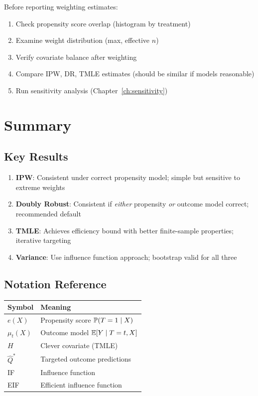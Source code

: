 Before reporting weighting estimates:
\begin{enumerate}
    \item Check propensity score overlap (histogram by treatment)
    \item Examine weight distribution (max, effective $n$)
    \item Verify covariate balance after weighting
    \item Compare IPW, DR, TMLE estimates (should be similar if models reasonable)
    \item Run sensitivity analysis (Chapter~\ref{ch:sensitivity})
\end{enumerate}

\section{Summary}
\label{sec:weighting_summary}

\subsection{Key Results}

\begin{enumerate}
    \item \textbf{IPW}: Consistent under correct propensity model; simple but sensitive to extreme weights

    \item \textbf{Doubly Robust}: Consistent if \emph{either} propensity \emph{or} outcome model correct; recommended default

    \item \textbf{TMLE}: Achieves efficiency bound with better finite-sample properties; iterative targeting

    \item \textbf{Variance}: Use influence function approach; bootstrap valid for all three
\end{enumerate}

\subsection{Notation Reference}

\begin{center}
\begin{tabular}{ll}
\toprule
Symbol & Meaning \\
\midrule
$e(X)$ & Propensity score $\mathbb{P}(T=1 \mid X)$ \\
$\mu_t(X)$ & Outcome model $\mathbb{E}[Y \mid T=t, X]$ \\
$H$ & Clever covariate (TMLE) \\
$\hat{Q}^*$ & Targeted outcome predictions \\
IF & Influence function \\
EIF & Efficient influence function \\
\bottomrule
\end{tabular}
\end{center}

